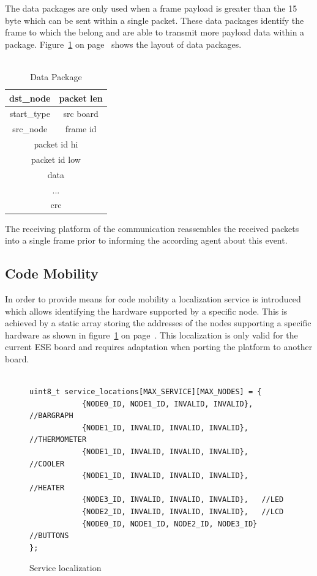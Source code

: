 \documentclass{scrreprt}
\begin{document}
\noindent
The data packages are only used when a frame payload is greater than the 15 byte which can be sent within a single packet.
These data packages identify the frame to which the belong and are able to transmit more payload data within a package.
Figure~\ref{fig:data} on page~\pageref{fig:data} shows the layout of data packages.\\\\

\begin{table}
\centering
\begin{tabular}{| c | c |}
  \hline
  dst_node &packet len \\ \hline
  start_type & 	src board \\ \hline
  src_node	&	frame id \\ \hline
  \multicolumn{2}{|c|}{packet id hi} \\ \hline
  \multicolumn{2}{|c|}{packet id low} \\ \hline
  \multicolumn{2}{|c|}{data} \\ \hline
  \multicolumn{2}{|c|}{...} \\ \hline
  \multicolumn{2}{|c|}{crc} \\ \hline
  
\end{tabular}
\caption{Data Package}
\label{fig:data}
\end{table}

\noindent
The receiving platform of the communication reassembles the received packets into a single frame prior to informing the
according agent about this event. \\

\subsection{Code Mobility}

In order to provide means for code mobility a localization service is introduced which allows identifying the hardware
supported by a specific node. This is achieved by a static array storing the addresses of the nodes supporting a specific hardware as shown in
figure~\ref{fig:service-loc} on page~\pageref{fig:service-loc}. This localization is only valid for the current ESE board and requires
adaptation when porting the platform to another board.\\

\begin{figure}[!htb]
\lstset{language=C, tabsize=2}
\begin{lstlisting}[frame=single]
	
uint8_t service_locations[MAX_SERVICE][MAX_NODES] = {
			{NODE0_ID, NODE1_ID, INVALID, INVALID},	 //BARGRAPH
			{NODE1_ID, INVALID, INVALID, INVALID}, 	 //THERMOMETER
			{NODE1_ID, INVALID, INVALID, INVALID},	 //COOLER
			{NODE1_ID, INVALID, INVALID, INVALID},   //HEATER
			{NODE3_ID, INVALID, INVALID, INVALID},   //LED
			{NODE2_ID, INVALID, INVALID, INVALID},   //LCD
			{NODE0_ID, NODE1_ID, NODE2_ID, NODE3_ID} //BUTTONS
};
\end{lstlisting}
\caption{Service localization}
\label{fig:service-loc}
\end{figure}
\end{document}
